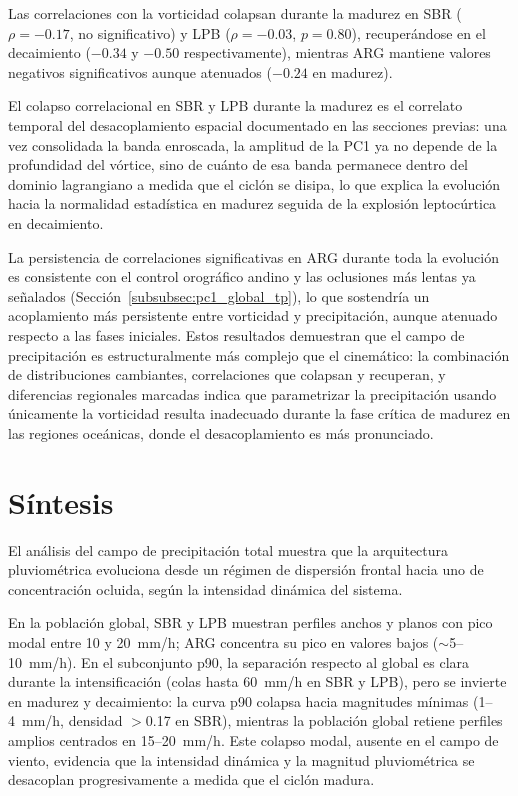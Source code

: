 Las correlaciones con la vorticidad colapsan durante la madurez en SBR ($\rho = -0.17$, no significativo) y LPB ($\rho = -0.03$, $p = 0.80$), recuperándose en el decaimiento ($-0.34$ y $-0.50$ respectivamente), mientras ARG mantiene valores negativos significativos aunque atenuados ($-0.24$ en madurez).

El colapso correlacional en SBR y LPB durante la madurez es el correlato temporal del desacoplamiento espacial documentado en las secciones previas: una vez consolidada la banda enroscada, la amplitud de la PC1 ya no depende de la profundidad del vórtice, sino de cuánto de esa banda permanece dentro del dominio lagrangiano a medida que el ciclón se disipa, lo que explica la evolución hacia la normalidad estadística en madurez seguida de la explosión leptocúrtica en decaimiento.

La persistencia de correlaciones significativas en ARG durante toda la evolución es consistente con el control orográfico
andino y las oclusiones más lentas ya señalados (Sección~\ref{subsubsec:pc1_global_tp}), lo que sostendría un acoplamiento más persistente entre vorticidad y precipitación, aunque atenuado respecto a las fases iniciales.
Estos resultados demuestran que el campo de precipitación es estructuralmente más complejo que el cinemático: la combinación de distribuciones cambiantes, correlaciones que colapsan y recuperan, y diferencias regionales marcadas indica que parametrizar la precipitación usando únicamente la vorticidad resulta inadecuado durante la fase crítica de madurez en las regiones oceánicas, donde el desacoplamiento es más pronunciado.

\section{Síntesis}\label{sec:sintesis_tp}

El análisis del campo de precipitación total muestra que la arquitectura pluviométrica evoluciona desde un régimen de dispersión frontal hacia uno de concentración ocluida, según la intensidad dinámica del sistema.

En la población global, SBR y LPB muestran perfiles anchos y planos con pico modal entre 10 y 20~mm/h; ARG concentra su pico en valores bajos ($\sim$5--10~mm/h). En el subconjunto p90, la separación respecto al global es clara durante la intensificación (colas hasta 60~mm/h en SBR y LPB), pero se invierte en madurez y decaimiento: la curva p90 colapsa hacia magnitudes mínimas (1--4~mm/h, densidad $>$0.17 en SBR), mientras la población global retiene perfiles amplios centrados en 15--20~mm/h. Este colapso modal, ausente en el campo de viento, evidencia que la intensidad dinámica y la magnitud pluviométrica se desacoplan progresivamente a medida que el ciclón madura.

